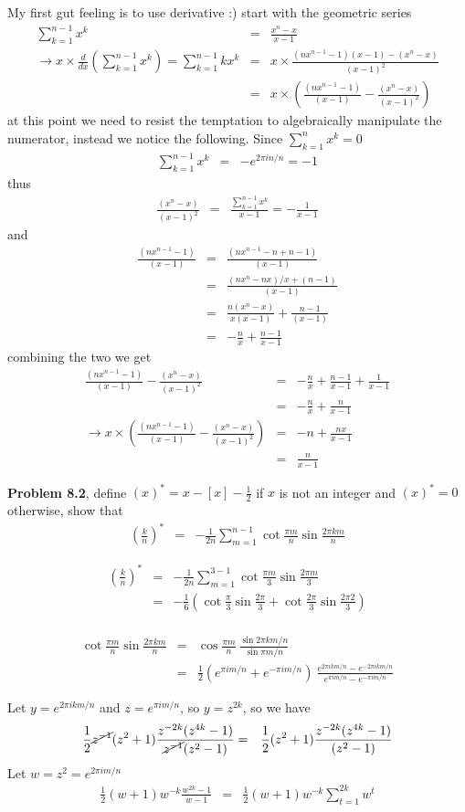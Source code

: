 \documentclass[aps,preprint,preprintnumbers,nofootinbib,showpacs,prd]{revtex4-1}
\newcommand{\nbea}{\begin{eqnarray*}}
\newcommand{\neea}{\end{eqnarray*}}
\begin{document}
My first gut feeling is to use derivative :) start with the geometric series
%
\nbea
\sum_{k=1}^{n-1} x^k & = & \frac{x^n-x}{x-1} \\
\to x \times \frac{d}{dx} \left ( \sum_{k=1}^{n-1} x^k\right ) = \sum_{k=1}^{n-1}kx^k & = & x \times \frac{(nx^{n-1}-1)(x-1) - (x^n-x)}{(x-1)^2} \\
& = & x \times \left ( \frac{(nx^{n-1}-1)}{(x-1)} - \frac{(x^n-x)}{(x-1)^2} \right )
\neea
%
at this point we need to resist the temptation to algebraically manipulate the numerator, instead we notice the following. Since $\sum_{k=1}^{n} x^k = 0$
%
\nbea
\sum_{k=1}^{n-1} x^k & = & -e^{2\pi i n/n} = -1
\neea
%
thus 
%
\nbea
\frac{(x^n-x)}{(x-1)^2} & = & \frac{\sum_{k=1}^{n-1} x^k }{x-1} = -\frac{1}{x-1}
\neea
%
and
%
\nbea
\frac{(nx^{n-1}-1)}{(x-1)} & = & \frac{(nx^{n-1}-n + n - 1)}{(x-1)} \\
& = & \frac{(nx^{n}-nx)/x + (n-1)}{(x-1)} \\
& = & \frac{n(x^{n}-x)}{x(x-1)} + \frac{n-1}{(x-1)} \\
& = & -\frac{n}{x} + \frac{n-1}{x-1}
\neea
%
combining the two we get
%
\nbea
\frac{(nx^{n-1}-1)}{(x-1)} - \frac{(x^n-x)}{(x-1)^2} & = & -\frac{n}{x} + \frac{n-1}{x-1} + \frac{1}{x-1} \\
& = & -\frac{n}{x} + \frac{n}{x-1} \\
\to x \times \left (\frac{(nx^{n-1}-1)}{(x-1)} - \frac{(x^n-x)}{(x-1)^2} \right ) & = & -n + \frac{nx}{x-1} \\
& = & \frac{n}{x-1}
\neea
%

{\bf Problem 8.2}, define $(x)^* = x - [x] - \frac{1}{2}$ if $x$ is not an integer and $(x)^* = 0$ otherwise, show that
%
\nbea
\left ( \frac{k}{n} \right )^* & = & -\frac{1}{2n} \sum_{m=1}^{n-1} \cot\frac{\pi m}{n} \sin \frac{2\pi k m}{n}
\neea
%

%
\nbea
\left ( \frac{k}{n} \right )^* & = & -\frac{1}{2n} \sum_{m=1}^{3-1} \cot\frac{\pi m}{3} \sin \frac{2\pi m}{3} \\
& = & -\frac{1}{6} \left ( \cot\frac{\pi}{3} \sin \frac{2\pi}{3} + \cot\frac{2\pi}{3} \sin \frac{2\pi 2}{3} \right ) \\
\neea
%

%
\nbea
\cot\frac{\pi m}{n} \sin \frac{2\pi k m}{n} & = & \cos\frac{\pi m}{n} ~ \frac{\sin 2\pi k m/n}{\sin\pi m/n} \\
& = & \frac{1}{2}(e^{\pi i m/n} + e^{-\pi i m/n}) ~ \frac{e^{2\pi i km/n} - e^{-2\pi i km/n}}{e^{\pi i m/n} - e^{-\pi i m/n}}
\neea
%

Let $y = e^{2\pi i km/n}$ and $z = e^{\pi i m/n}$, so $y = z^{2k}$, so we have
%
\nbea
\frac{1}{2}\cancel{z^{-1}}(z^2 + 1) \frac{z^{-2k}(z^{4k} - 1)}{\cancel{z^{-1}}(z^2 - 1)} & = & \frac{1}{2}(z^2 + 1) \frac{z^{-2k}(z^{4k} - 1)}{(z^2 - 1)}
\neea
%
Let $w = z^2 = e^{2\pi i m/n}$
%
\nbea
\frac{1}{2}(w + 1) w^{-k} \frac{w^{2k} - 1}{w-1} & = & \frac{1}{2}(w+1) w^{-k} \sum_{t=1}^{2k} w^t
\neea
%
\end{document}
